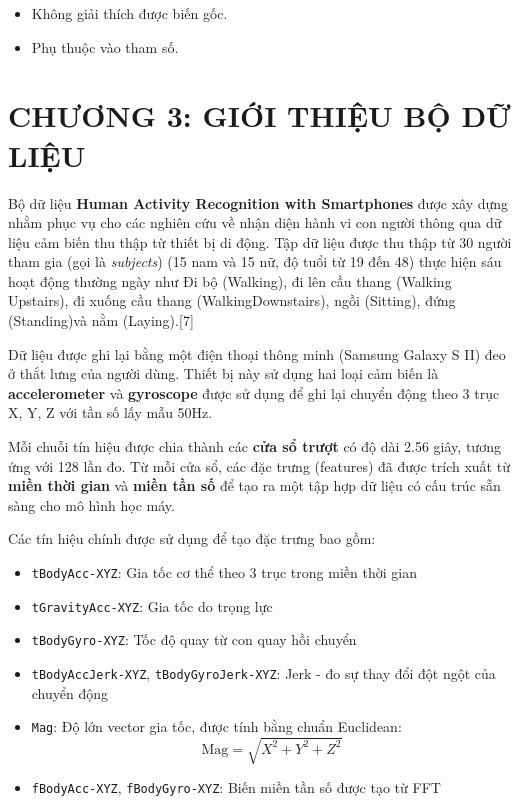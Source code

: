 \documentclass[
]{article}
\providecommand{\tightlist}{%
  \setlength{\itemsep}{0pt}\setlength{\parskip}{0pt}}
\begin{document}
\begin{itemize}
\tightlist
\item
  Không giải thích được biến gốc.
\item
  Phụ thuộc vào tham số.
\end{itemize}

\section*{CHƯƠNG 3: GIỚI THIỆU BỘ DỮ LIỆU}
\setcounter{section}{3}

Bộ dữ liệu \textbf{Human Activity Recognition with Smartphones} được xây
dựng nhằm phục vụ cho các nghiên cứu về nhận diện hành vi con người
thông qua dữ liệu cảm biến thu thập từ thiết bị di động. Tập dữ liệu
được thu thập từ 30 người tham gia (gọi là \emph{subjects}) (15 nam và
15 nữ, độ tuổi từ 19 đến 48) thực hiện sáu hoạt động thường ngày như Đi
bộ (Walking), đi lên cầu thang (Walking Upstairs), đi xuống cầu thang
(WalkingDownstairs), ngồi (Sitting), đứng (Standing)và nằm
(Laying).{[}7{]}

Dữ liệu được ghi lại bằng một điện thoại thông minh (Samsung Galaxy S
II) đeo ở thắt lưng của người dùng. Thiết bị này sử dụng hai loại cảm
biến là \textbf{accelerometer} và \textbf{gyroscope} được sử dụng để ghi
lại chuyển động theo 3 trục X, Y, Z với tần số lấy mẫu 50Hz.

Mỗi chuỗi tín hiệu được chia thành các \textbf{cửa sổ trượt} có độ dài
2.56 giây, tương ứng với 128 lần đo. Từ mỗi cửa sổ, các đặc trưng
(features) đã được trích xuất từ \textbf{miền thời gian} và \textbf{miền
tần số} để tạo ra một tập hợp dữ liệu có cấu trúc sẵn sàng cho mô hình
học máy.

Các tín hiệu chính được sử dụng để tạo đặc trưng bao gồm:

\begin{itemize}
\tightlist
\item
  \texttt{tBodyAcc-XYZ}: Gia tốc cơ thể theo 3 trục trong miền thời
  gian\\
\item
  \texttt{tGravityAcc-XYZ}: Gia tốc do trọng lực\\
\item
  \texttt{tBodyGyro-XYZ}: Tốc độ quay từ con quay hồi chuyển\\
\item
  \texttt{tBodyAccJerk-XYZ}, \texttt{tBodyGyroJerk-XYZ}: Jerk - đo sự
  thay đổi đột ngột của chuyển động\\
\item
  \texttt{Mag}: Độ lớn vector gia tốc, được tính bằng chuẩn Euclidean:\\
  \[
  \text{Mag} = \sqrt{X^2 + Y^2 + Z^2}
  \]
\item
  \texttt{fBodyAcc-XYZ}, \texttt{fBodyGyro-XYZ}: Biến miền tần số được
  tạo từ FFT
\end{itemize}
\end{document}
